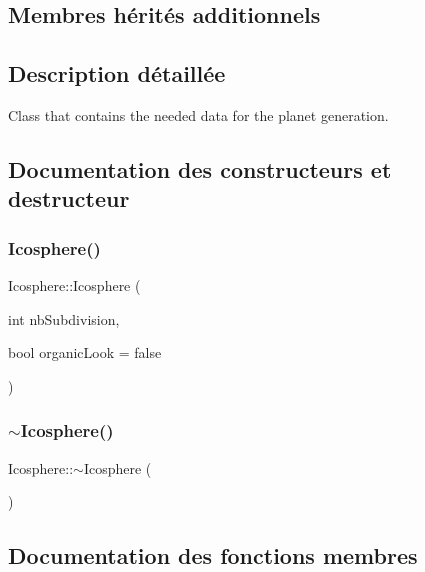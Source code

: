 \subsection*{Membres hérités additionnels}


\subsection{Description détaillée}
Class that contains the needed data for the planet generation. 

\subsection{Documentation des constructeurs et destructeur}
\mbox{\label{class_icosphere_acbbb6a69f296101cbf883e8b17d0e24f}} 
\subsubsection{\texorpdfstring{Icosphere()}{Icosphere()}}
{\footnotesize\ttfamily Icosphere\+::\+Icosphere (\begin{DoxyParamCaption}\item[{int}]{nb\+Subdivision,  }\item[{bool}]{organic\+Look = {\ttfamily false} }\end{DoxyParamCaption})}

\mbox{\label{class_icosphere_ac9473c8c8d6085b6370d95772b898a45}} 
\subsubsection{\texorpdfstring{$\sim$\+Icosphere()}{~Icosphere()}}
{\footnotesize\ttfamily Icosphere\+::$\sim$\+Icosphere (\begin{DoxyParamCaption}{ }\end{DoxyParamCaption})}



\subsection{Documentation des fonctions membres}
\mbox{\label{class_icosphere_aae0a9d0e0cff48ca120bd401e2cb14f4}} 

